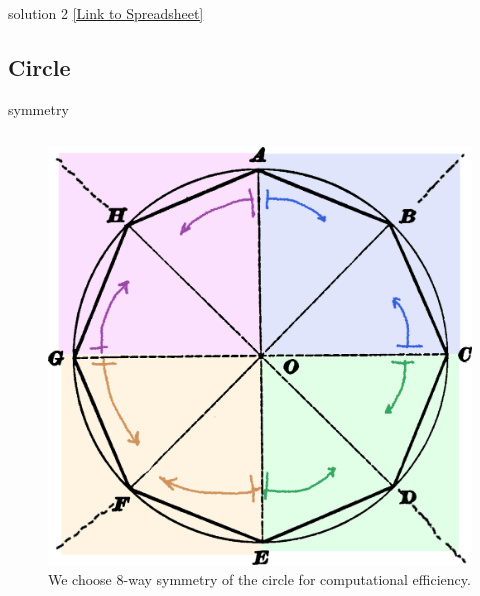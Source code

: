 \documentclass[aspectratio=169,xcolor={dvipsnames,svgnames}]{beamer}
\begin{document}
\begin{frame}[label={sec:orgc18c899}]{solution 2}
\centering
\href{https://docs.google.com/spreadsheets/d/13s1unOAzBQmYA4SF9ifBtw02AEAUlfRTaOvl4m2cbEc/edit?usp=sharing}{[Link to Spreadsheet]​}
\end{frame}
\subsection{Circle}
\label{sec:orgab6726e}


\begin{frame}[label={sec:orgbd3a5bc}]{symmetry}
\begin{columns}
\begin{column}{.45\columnwidth}
\begin{figure}[htbp]
\centering
\includegraphics[width=.9\linewidth]{images/circle-8way.png}
\caption{We choose 8-way symmetry of the circle for computational efficiency.}
\end{figure}
\end{column}
\end{columns}
\end{frame}
\end{document}
